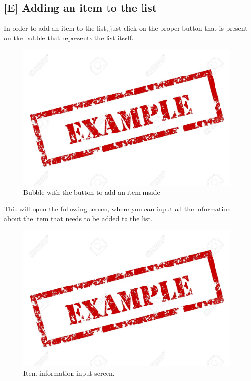 \subsection{[E] Adding an item to the list}
In order to add an item to the list, just click on the proper button that is present on the bubble that represents the list itself.

\begin{figure}[H]
  \centering 
  \includegraphics[width=\textwidth]{Sections/3-HowToUse/Images/example.jpeg}
  \caption{Bubble with the button to add an item inside.}
\end{figure}

This will open the following screen, where you can input all the information about the item that needs to be added to the list. \\

\begin{figure}[H]
  \centering 
  \includegraphics[width=\textwidth]{Sections/3-HowToUse/Images/example.jpeg}
  \caption{Item information input screen.}
\end{figure}

